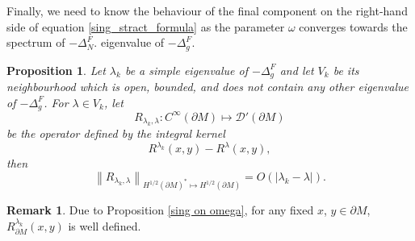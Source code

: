 \documentclass[12pt,a4paper]{amsart}
\numberwithin{equation}{section}
\theoremstyle{plain}
\newtheorem{proposition}[theorem]{Proposition}
\theoremstyle{definition}
\newtheorem{remark}[theorem]{Remark}
\begin{document}
Finally, we need to know the behaviour of the final component on the right-hand side of equation \eqref{sing_stract_formula} as the parameter $\omega$ converges towards the spectrum of $-\Delta_N^F$. eigenvalue of $-\Delta_g^F$.

\begin{proposition}\label{tr}
		Let $\lambda_k$ be a simple eigenvalue of $-\Delta_g^F$ and let $V_k$ be its neighbourhood which is open, bounded, and does not contain any other eigenvalue of $-\Delta_g^F$. For $\lambda\in V_k$, let
		\begin{equation}
			R_{\lambda_k,\lambda}: C^\infty(\partial M) \mapsto \mathcal{D}'(\partial M)
		\end{equation}
		be the operator defined by the integral kernel 
		$$R^{\lambda_k}(x,y) - R^\lambda(x,y),$$
		then
		\begin{equation*}
			\left\| R_{\lambda_k,\lambda} \right\|_{H^{1/2}(\partial M)^* \mapsto H^{1/2}(\partial M)} = O(|\lambda_k - \lambda|).
		\end{equation*}
\end{proposition} 

\begin{remark}
    Due to Proposition \ref{sing on omega}, for any fixed $x$, $y\in \partial M$, $R_{\partial M}^{\lambda_k}(x,y)$ is well defined.
\end{remark}
	
\end{document}
